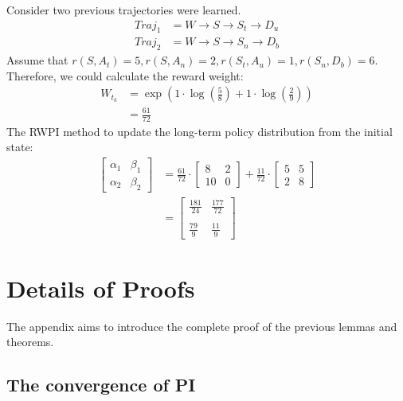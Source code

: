Consider two previous trajectories were learned. $$
\begin{aligned}
Traj_{1} &= {W \rightarrow S \rightarrow S_{t} \rightarrow D_u}\\
Traj_2 &= {W \rightarrow S \rightarrow S_n \rightarrow D_b}
\end{aligned}
$$
Assume that $r(S,A_t)=5, r(S,A_n)=2, r(S_t,A_u)=1, r(S_n,D_b)=6$. Therefore, we could calculate the reward weight:
$$
\begin{aligned}
W_{t_{k}} &= \exp{(1 \cdot \log(\frac{5}{8}) + 1 \cdot \log(\frac{2}{9}))}\\
&= \frac{61}{72}
\end{aligned}
$$
The RWPI method to update the long-term policy distribution from the initial state:
$$
\begin{aligned}
\begin{bmatrix} \alpha_1 & \beta_1 \\ \alpha_2 & \beta_2 \end{bmatrix} &= \frac{61}{72} \cdot \begin{bmatrix} 8 & 2 \\ 10 &  0 \end{bmatrix} + \frac{11}{72} \cdot \begin{bmatrix} 5 & 5 \\ 2 & 8 \end{bmatrix}\\
&= \begin{bmatrix} \frac{181}{24} & \frac{177}{72} \\ \\ \frac{79}{9} & \frac{11}{9} \end{bmatrix}
\end{aligned}
$$

\section{Details of Proofs}
The appendix aims to introduce the complete proof of the previous lemmas and theorems. 
\subsection{The convergence of PI}

